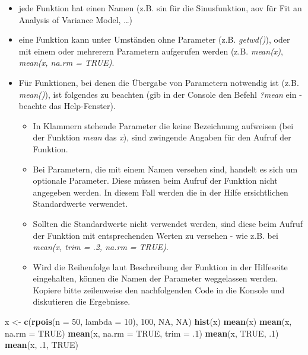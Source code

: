 \documentclass[]{article}
\newenvironment{Shaded}{\begin{snugshade}}{\end{snugshade}}
\newcommand{\KeywordTok}[1]{\textcolor[rgb]{0.13,0.29,0.53}{\textbf{#1}}}
\newcommand{\DataTypeTok}[1]{\textcolor[rgb]{0.13,0.29,0.53}{#1}}
\newcommand{\DecValTok}[1]{\textcolor[rgb]{0.00,0.00,0.81}{#1}}
\newcommand{\StringTok}[1]{\textcolor[rgb]{0.31,0.60,0.02}{#1}}
\newcommand{\OtherTok}[1]{\textcolor[rgb]{0.56,0.35,0.01}{#1}}
\newcommand{\NormalTok}[1]{#1}
\providecommand{\tightlist}{%
  \setlength{\itemsep}{0pt}\setlength{\parskip}{0pt}}
\begin{document}
\begin{itemize}
\tightlist
\item
  jede Funktion hat einen Namen (z.B. sin für die Sinusfunktion, aov für
  Fit an Analysis of Variance Model, \ldots{})
\item
  eine Funktion kann unter Umständen ohne Parameter (z.B.
  \emph{getwd()}), oder mit einem oder mehrerern Parametern aufgerufen
  werden (z.B. \emph{mean(x)}, \emph{mean(x, na.rm = TRUE)}.
\item
  Für Funktionen, bei denen die Übergabe von Parametern notwendig ist
  (z.B. \emph{mean()}), ist folgendes zu beachten (gib in der Console
  den Befehl \emph{?mean} ein - beachte das Help-Fenster).

  \begin{itemize}
  \tightlist
  \item
    In Klammern stehende Parameter die keine Bezeichnung aufweisen (bei
    der Funktion \emph{mean} das \emph{x}), sind zwingende Angaben für
    den Aufruf der Funktion.
  \item
    Bei Parametern, die mit einem Namen versehen sind, handelt es sich
    um optionale Parameter. Diese müssen beim Aufruf der Funktion nicht
    angegeben werden. In diesem Fall werden die in der Hilfe
    ersichtlichen Standardwerte verwendet.
  \item
    Sollten die Standardwerte nicht verwendet werden, sind diese beim
    Aufruf der Funktion mit entsprechenden Werten zu versehen - wie z.B.
    bei \emph{mean(x, trim = .2, na.rm = TRUE)}.
  \item
    Wird die Reihenfolge laut Beschreibung der Funktion in der
    Hilfeseite eingehalten, können die Namen der Parameter weggelassen
    werden. Kopiere bitte zeilenweise den nachfolgenden Code in die
    Konsole und diskutieren die Ergebnisse.
  \end{itemize}
\end{itemize}

\begin{Shaded}
\begin{Highlighting}[]
\NormalTok{x <-}\StringTok{ }\KeywordTok{c}\NormalTok{(}\KeywordTok{rpois}\NormalTok{(}\DataTypeTok{n =} \DecValTok{50}\NormalTok{, }\DataTypeTok{lambda =} \DecValTok{10}\NormalTok{), }\DecValTok{100}\NormalTok{, }\OtherTok{NA}\NormalTok{, }\OtherTok{NA}\NormalTok{)}
\KeywordTok{hist}\NormalTok{(x)}
\KeywordTok{mean}\NormalTok{(x)}
\KeywordTok{mean}\NormalTok{(x, }\DataTypeTok{na.rm =} \OtherTok{TRUE}\NormalTok{)}
\KeywordTok{mean}\NormalTok{(x, }\DataTypeTok{na.rm =} \OtherTok{TRUE}\NormalTok{, }\DataTypeTok{trim =}\NormalTok{ .}\DecValTok{1}\NormalTok{)}
\KeywordTok{mean}\NormalTok{(x, }\OtherTok{TRUE}\NormalTok{, .}\DecValTok{1}\NormalTok{)}
\KeywordTok{mean}\NormalTok{(x, .}\DecValTok{1}\NormalTok{, }\OtherTok{TRUE}\NormalTok{)}
\end{Highlighting}
\end{Shaded}
\end{document}
